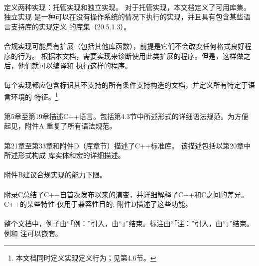 \paragraph{}
定义两种实现：托管实现和独立实现。 对于托管实现，本文档定义了可用库集。 独立实现
是一种可以在没有操作系统的情况下执行的实现，并且具有包含某些语言支持库的实现定义
的库集（20.5.1.3）。

\paragraph{}
合规实现可能具有扩展（包括其他库函数），前提是它们不会改变任何格式良好程序的行为。
根据本文档，需要实现来诊断使用此类扩展的程序。但是，这样做之后，他们就可以编译和
执行这样的程序。

\paragraph{}
每个实现都应包含标识其不支持的所有条件支持构造的文档，并定义所有特定于语言环境的
特征。\footnote{本文档同时定义实现定义行为；见第4.6节。}

\paragraph{}
第5章至第19章描述C++语言。包括第4.3节中所述形式的详细语法规范。为方便起见，附件A
重复了所有语法规范。

\paragraph{}
第21章至第33章和附件D（库章节）描述了C++标准库。 该描述包括以第20章中所述形式构成
库实体和宏的详细描述。

\paragraph{}
附件B建议合规实现的能力下限。

\paragraph{}
附录C总结了C++自首次发布以来的演变，并详细解释了C++和C之间的差异。C++的某些特性
仅用于兼容性目的; 附件D描述了这些功能。

\paragraph{}
整个文档中，例子由“「例：”引入，由“」”结束。标注由“「注：”引入，由“」”结束。例和
注可以嵌套。

